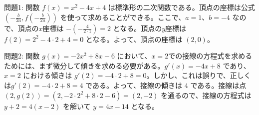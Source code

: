 \documentclass[a4paper,11pt]{article}
\numberwithin{equation}{section}
\theoremstyle{definition}
\theoremstyle{remark}
\begin{document}
問題1: 関数 $f(x) = x^2 - 4x + 4$ は標準形の二次関数である。頂点の座標は公式 $\left(-\frac{b}{2a}, f\left(-\frac{b}{2a}\right)\right)$ を使って求めることができる。ここで、$a = 1$、$b = -4$ なので、頂点の$x$座標は $-\left(-\frac{4}{2\cdot 1}\right) = 2$ となる。頂点の$y$座標は $f(2) = 2^2 - 4\cdot 2 + 4 = 0$ となる。よって、頂点の座標は $(2, 0)$。

問題2: 関数 $g(x) = -2x^2 + 8x - 6$ において、$x = 2$での接線の方程式を求めるためには、まず微分して傾きを求める必要がある。$g'(x) = -4x + 8$ であり、$x = 2$ における傾きは $g'(2) = -4\cdot 2 + 8 = 0$。しかし、これは誤りで、正しくは$g'(2) = -4\cdot 2 + 8 = 4$ である。よって、接線の傾きは $4$ である。接線は点 $(2, g(2)) = (2, -2\cdot 2^2 + 8\cdot 2 - 6) = (2, -2)$ を通るので、接線の方程式は $y + 2 = 4(x - 2)$ を解いて $y = 4x - 14$ となる。
\end{document}
